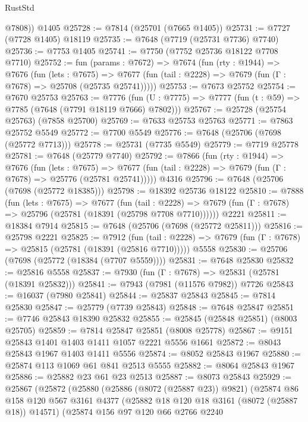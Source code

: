 \begin{lexlean}{RustStd}
\begin{coremodule}
{\begin{coremodule}
{{{{{{{{{{{{{{{{{{{{{{{{{{{{{{{{{{{{{{{{{{{{{{{{{{{{{        @7808))
    @1405
@25728 := @7814 (@25701 (@7665 @1405))
@25731 := @7727 (@7728 @1405) @18119
@25735 := @7648 (@7719 (@25731 @7736) @7740)
@25736 := @7753 @1405
@25741 := @7750 (@7752 @25736 @18122 @7708 @7710)
@25752 := fun (params : @7672) =>
  @7674
    (fun (rty : @1944) =>
    @7676
      (fun (lets : @7675) =>
      @7677 (fun (tail : @2228) => @7679 (fun (Γ : @7678) => @25708 (@25735 @25741)))))
@25753 := @7673 @25752
@25754 := @7670 @25753
@25763 := @7776
    (fun (U : @7775) => @7777 (fun (t : @59) => @7785 (@7648 (@7791 @18119 @7666) @7802)))
@25767 := @25728 (@25754 @25763) (@7858 @25700)
@25769 := @7633 @25753 @25763
@25771 := @7863 @25752 @5549
@25772 := @7700 @5549
@25776 := @7648 (@25706 (@7698 (@25772 @7713)))
@25778 := @25731 (@7735 @5549)
@25779 := @7719 @25778
@25781 := @7648 (@25779 @7740)
@25792 := @7866
    (fun (rty : @1944) =>
    @7676
      (fun (lets : @7675) =>
      @7677 (fun (tail : @2228) => @7679 (fun (Γ : @7678) => @25776 (@25781 @25741)))))
    @4316
@25796 := @7648 (@25706 (@7698 (@25772 @18385)))
@25798 := @18392 @25736 @18122
@25810 := @7888
    (fun (lets : @7675) =>
    @7677
      (fun (tail : @2228) =>
      @7679 (fun (Γ : @7678) => @25796 (@25781 (@18391 (@25798 @7708 @7710))))))
    @2221
@25811 := @18384 @7914
@25815 := @7648 (@25706 (@7698 (@25772 @25811)))
@25816 := @25798 @2221
@25825 := @7912
    (fun (tail : @2228) => @7679 (fun (Γ : @7678) => @25815 (@25781 (@18391 (@25816 @7710)))))
    @5558
@25830 := @25706 (@7698 (@25772 (@18384 (@7707 @5559))))
@25831 := @7648 @25830
@25832 := @25816 @5558
@25837 := @7930 (fun (Γ : @7678) => @25831 (@25781 (@18391 @25832)))
@25841 := @7943 (@7981 (@11576 @7982)) @7726
@25843 := @16037 (@7980 @25841)
@25844 := @25837 @25843
@25845 := @7814 @25830
@25847 := @25779 (@7739 @25843)
@25848 := @7648 @25847
@25851 := @7746 @25843 @18390 @25832
@25855 := @25845 (@25848 @25851) (@8003 @25705)
@25859 := @7814 @25847 @25851 (@8008 @25778)
@25867 := @9151 @25843 @1401 @1403 @1411 @1057 @2221 @5556 @1661
@25872 := @8043 @25843 @1967 @1403 @1411 @5556
@25874 := @8052 @25843 @1967
@25880 := @25874 @113 @1069 @61 @841 @2513 @5555
@25882 := @8064 @25843 @1967
@25886 := @25882 @23 @61 @23 @2513
@25887 := @8073 @25843
@25929 := @25867
    (@25872
      (@25880
        (@25886 (@8072 (@25887 @23)) @9821)
        (@25874
          @86
          @158
          @120
          @567
          @3161
          @4377
          (@25882 @18 @120 @18 @3161 (@8072 (@25887 @18)) @14571)
          (@25874
            @156
            @97
            @120
            @66
            @2766
            @2240
}}}}}}}}}}}}}}}}}}}}}}}}}}}}}}}}}}}}}}}}}}}}}}}}}}}}}
\end{coremodule}}
\end{coremodule}
\end{lexlean}
